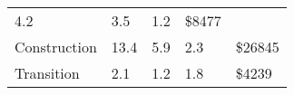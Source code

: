 \begin{longtable}[c]{@{}lllll@{}}
\begin{minipage}[t]{0.17\columnwidth}
4.2
\strut\end{minipage} &
\begin{minipage}[t]{0.17\columnwidth}\raggedright\strut
3.5
\strut\end{minipage} &
\begin{minipage}[t]{0.17\columnwidth}\raggedright\strut
1.2
\strut\end{minipage} &
\begin{minipage}[t]{0.17\columnwidth}\raggedright\strut
\$8477
\strut\end{minipage}\tabularnewline
\begin{minipage}[t]{0.17\columnwidth}\raggedright\strut
Construction
\strut\end{minipage} &
\begin{minipage}[t]{0.17\columnwidth}\raggedright\strut
13.4
\strut\end{minipage} &
\begin{minipage}[t]{0.17\columnwidth}\raggedright\strut
5.9
\strut\end{minipage} &
\begin{minipage}[t]{0.17\columnwidth}\raggedright\strut
2.3
\strut\end{minipage} &
\begin{minipage}[t]{0.17\columnwidth}\raggedright\strut
\$26845
\strut\end{minipage}\tabularnewline
\begin{minipage}[t]{0.17\columnwidth}\raggedright\strut
Transition
\strut\end{minipage} &
\begin{minipage}[t]{0.17\columnwidth}\raggedright\strut
2.1
\strut\end{minipage} &
\begin{minipage}[t]{0.17\columnwidth}\raggedright\strut
1.2
\strut\end{minipage} &
\begin{minipage}[t]{0.17\columnwidth}\raggedright\strut
1.8
\strut\end{minipage} &
\begin{minipage}[t]{0.17\columnwidth}\raggedright\strut
\$4239
\strut\end{minipage}\tabularnewline
\bottomrule
\end{longtable}
